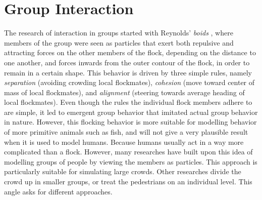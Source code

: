 \documentclass[11pt, a4paper]{book}
\begin{document}
\section{Group Interaction}
The research of interaction in groups started with Reynolds' \emph{boids} \cite{Reynolds87flocks} , where members of the group were seen as particles that exert both repulsive and attracting forces on the other members of the flock, depending on the distance to one another, and forces inwards from the outer contour of the flock, in order to remain in a certain shape.  This behavior is driven by three simple rules, namely \emph{separation} (avoiding crowding local flockmates), \emph{cohesion} (move toward center of mass of local flockmates), and \emph{alignment} (steering towards average heading of local flockmates). Even though the rules the individual flock members adhere to are simple, it led to emergent group behavior that imitated actual group behavior in nature. However, this flocking behavior is more suitable for modelling behavior of more primitive animals such as fish, and will not give a very plausible result when it is used to model humans. Because humans usually act in a way more complicated than a flock. However, many researches have built upon this idea of modelling groups of people by viewing the members as particles. This approach is particularly suitable for simulating large crowds. Other researches divide the crowd up in smaller groups, or treat the pedestrians on an individual level. This angle asks for different approaches.
\end{document}

